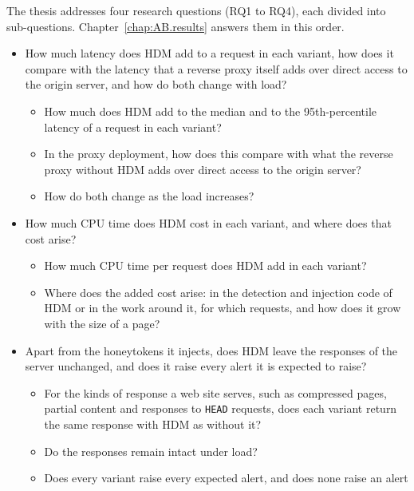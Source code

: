 \documentclass{rptuma}
\begin{document}
The thesis addresses four research questions (RQ1 to RQ4), each divided into sub-questions.
Chapter~\ref{chap:AB.results} answers them in this order.

\begin{itemize}[leftmargin=3.2em,labelwidth=2.6em,labelsep=0.6em]
  \item[\textbf{RQ1}] How much latency does HDM add to a request in each variant, how does it
    compare with the latency that a reverse proxy itself adds over direct access to the origin
    server, and how do both change with load?
    \begin{itemize}[leftmargin=3.4em,labelwidth=2.8em,labelsep=0.6em]
      \item[RQ1.1] How much does HDM add to the median and to the 95th-percentile latency of a
        request in each variant?
      \item[RQ1.2] In the proxy deployment, how does this compare with what the reverse proxy
        without HDM adds over direct access to the origin server?
      \item[RQ1.3] How do both change as the load increases?
    \end{itemize}
  \item[\textbf{RQ2}] How much CPU time does HDM cost in each variant, and where does that cost
    arise?
    \begin{itemize}[leftmargin=3.4em,labelwidth=2.8em,labelsep=0.6em]
      \item[RQ2.1] How much CPU time per request does HDM add in each variant?
      \item[RQ2.2] Where does the added cost arise: in the detection and injection code of HDM or
        in the work around it, for which requests, and how does it grow with the size of a page?
    \end{itemize}
  \item[\textbf{RQ3}] Apart from the honeytokens it injects, does HDM leave the responses of the
    server unchanged, and does it raise every alert it is expected to raise?
    \begin{itemize}[leftmargin=3.4em,labelwidth=2.8em,labelsep=0.6em]
      \item[RQ3.1] For the kinds of response a web site serves, such as compressed pages, partial
        content and responses to \texttt{HEAD} requests, does each variant return the same
        response with HDM as without it?
      \item[RQ3.2] Do the responses remain intact under load?
      \item[RQ3.3] Does every variant raise every expected alert, and does none raise an alert

\end{itemize}
\end{itemize}
\end{document}
